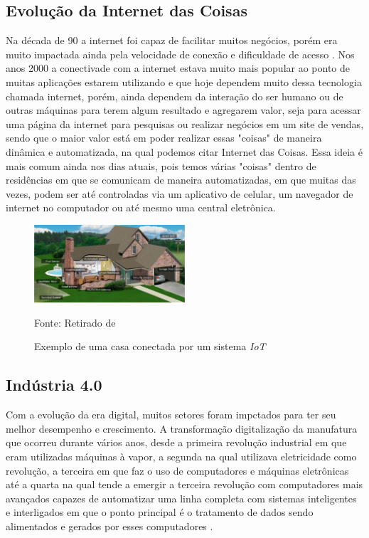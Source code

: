 \documentclass[../../layout.tex]{subfiles}
\begin{document}
\subsection{Evolução da Internet das Coisas}
\hspace*{3em}Na década de 90 a internet foi capaz de facilitar muitos negócios, porém era muito impactada ainda pela velocidade de conexão e dificuldade de acesso \cite{iot_evolution}. Nos anos 2000 a conectivade com a internet estava muito mais popular ao ponto de muitas aplicações estarem utilizando e que hoje dependem muito dessa tecnologia chamada internet, porém, ainda dependem da interação do ser humano ou de outras máquinas para terem algum resultado e agregarem valor, seja para acessar uma página da internet para pesquisas ou realizar negócios em um site de vendas, sendo que o maior valor está em poder realizar essas "coisas" de maneira dinâmica e automatizada, na qual podemos citar Internet das Coisas. Essa ideia é mais comum ainda nos dias atuais, pois temos várias "coisas" dentro de residências em que se comunicam de maneira automatizadas, em que muitas das vezes, podem ser até controladas via um aplicativo de celular, um navegador de internet no computador ou até mesmo uma central eletrônica.

\begin{figure}[H]
\centering
\caption{Exemplo de uma casa conectada por um sistema \emph{IoT}}
\includegraphics[width=0.5\textwidth]{assets/static/img/iothouse.jpg}
\label{fig:i2c}

\begin{minipage}{0.5\textwidth}
\raggedright \footnotesize Fonte: Retirado de  
\end{minipage}
\end{figure}

\subsection{Indústria 4.0}
\hspace*{3em}Com a evolução da era digital, muitos setores foram impctados para ter seu melhor desempenho e crescimento. A transformação digitalização da manufatura que ocorreu durante vários anos, desde a primeira revolução industrial em que eram utilizadas máquinas à vapor, a segunda na qual utilizava eletricidade como revolução, a terceira em que faz o uso de computadores e máquinas eletrônicas até a quarta na qual tende a emergir a terceira revolução com computadores mais avançados capazes de automatizar uma linha completa com sistemas inteligentes e interligados em que o ponto principal é o tratamento de dados sendo alimentados e gerados por esses computadores .
\end{document}
